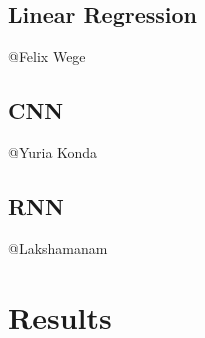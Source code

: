 \documentclass[runningheads,a4paper]{llncs}
\begin{document}
\subsection{Linear Regression}

@Felix Wege

\subsection{CNN}

@Yuria Konda

\subsection{RNN}

@Lakshamanam

\section{Results}


\begin{thebibliography}{4}


\end{thebibliography}
\end{document}
